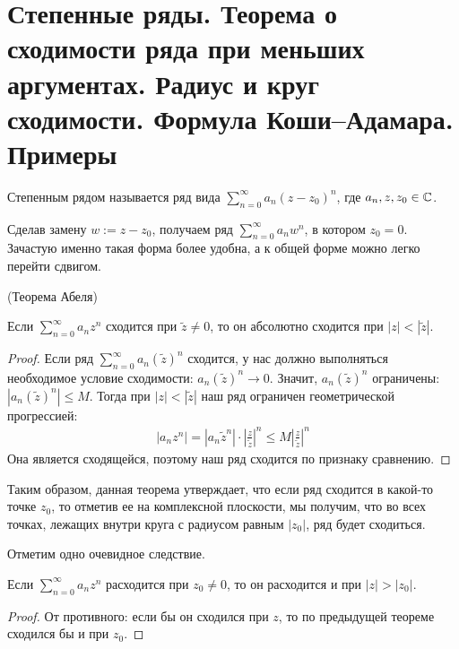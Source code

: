 \section{Степенные ряды. Теорема о сходимости ряда при меньших аргументах. Радиус и круг сходимости. Формула Коши–Адамара. Примеры}
\begin{conj}
    Степенным рядом называется ряд вида $\sum\limits_{n=0}^\infty a_n(z - z_0)^n$, где $a_n, z, z_0 \in \mathbb{C}$.
\end{conj}
\begin{notice}
    Сделав замену $w := z - z_0$, получаем ряд $\sum\limits_{n=0}^\infty a_n w^n$, в котором $z_0 = 0$. 
    Зачастую именно такая форма более удобна, а к общей форме можно легко перейти сдвигом.
\end{notice}

\vspace*{5mm}

\begin{theorem} (Теорема Абеля)

    Если $\sum\limits_{n=0}^\infty a_n z^n$ сходится при $\widetilde{z} \neq 0$, то он абсолютно сходится при $|z| < |\widetilde{z}|$.    
\end{theorem}
\begin{proof}
    Если ряд $\sum\limits_{n=0}^\infty a_n (\widetilde{z})^n$ сходится, у нас должно выполняться необходимое условие сходимости: $a_n(\widetilde{z})^n \to 0$.
    Значит, $a_n(\widetilde{z})^n$ ограничены: $|a_n(\widetilde{z})^n| \leqslant M$. 
    Тогда при $|z| < |\widetilde{z}|$ наш ряд ограничен геометрической прогрессией:
    \begin{gather*}
        |a_nz^n| = |a_n\widetilde{z}^n| \cdot \left| \frac{z}{\widetilde{z}} \right|^n \leqslant M \left|\frac{z}{\widetilde{z}} \right|^n
    \end{gather*}
    Она является сходящейся, поэтому наш ряд сходится по признаку сравнению.
\end{proof}

Таким образом, данная теорема утверждает, что если ряд сходится в какой-то точке $z_0$, то отметив ее на комплексной плоскости, мы получим, что во всех точках, лежащих внутри круга с радиусом равным $|z_0|$, ряд будет сходиться.

Отметим одно очевидное следствие.

\begin{follow}
    Если $\sum\limits_{n=0}^\infty a_n z^n$ расходится при $z_0 \neq 0$, то он расходится и при $|z| > |z_0|$.
\end{follow}
\begin{proof}
    От противного: если бы он сходился при $z$, то по предыдущей теореме сходился бы и при $z_0$.
\end{proof}

